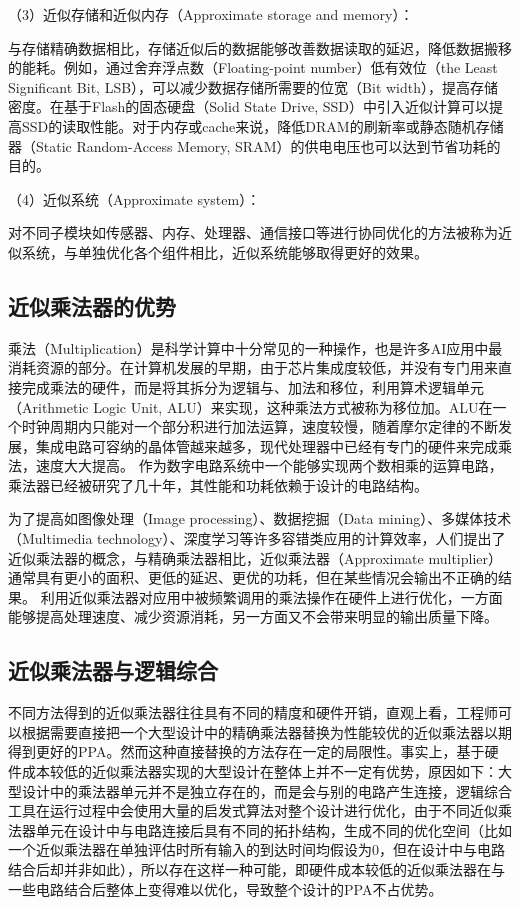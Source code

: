 （3）近似存储和近似内存（Approximate storage and memory）：

与存储精确数据相比，存储近似后的数据能够改善数据读取的延迟，降低数据搬移的能耗。例如，通过舍弃浮点数（Floating-point number）低有效位（the Least Significant Bit, LSB），可以减少数据存储所需要的位宽（Bit width），提高存储密度。在基于Flash的固态硬盘（Solid State Drive, SSD）中引入近似计算可以提高SSD的读取性能\cite{AC:Store:ASCache}。对于内存或cache来说，降低DRAM的刷新率\cite{AC:Store:DRAM}或静态随机存储器（Static Random-Access Memory, SRAM）\cite{AC:Store:SRAM}的供电电压也可以达到节省功耗的目的。

（4）近似系统（Approximate system）：

对不同子模块如传感器、内存、处理器、通信接口等进行协同优化的方法被称为近似系统，与单独优化各个组件相比，近似系统能够取得更好的效果\cite{AC:Sys:camera}。

\subsection{近似乘法器的优势}

乘法（Multiplication）是科学计算中十分常见的一种操作，也是许多AI应用中最消耗资源的部分\cite{AC:AM:Overfit}。在计算机发展的早期，由于芯片集成度较低，并没有专门用来直接完成乘法的硬件，而是将其拆分为逻辑与、加法和移位，利用算术逻辑单元（Arithmetic Logic Unit, ALU）来实现，这种乘法方式被称为移位加\cite{计算机体系结构基础}。ALU在一个时钟周期内只能对一个部分积进行加法运算，速度较慢，随着摩尔定律的不断发展，集成电路可容纳的晶体管越来越多，现代处理器中已经有专门的硬件来完成乘法，速度大大提高。
作为数字电路系统中一个能够实现两个数相乘的运算电路，乘法器已经被研究了几十年，其性能和功耗依赖于设计的电路结构。

为了提高如图像处理（Image processing）、数据挖掘（Data mining）、多媒体技术（Multimedia technology）、深度学习等许多容错类应用的计算效率，人们提出了近似乘法器的概念，与精确乘法器相比，近似乘法器（Approximate multiplier）通常具有更小的面积、更低的延迟、更优的功耗，但在某些情况会输出不正确的结果。
利用近似乘法器对应用中被频繁调用的乘法操作在硬件上进行优化，一方面能够提高处理速度、减少资源消耗，另一方面又不会带来明显的输出质量下降。

\subsection{近似乘法器与逻辑综合}

不同方法得到的近似乘法器往往具有不同的精度和硬件开销，直观上看，工程师可以根据需要直接把一个大型设计中的精确乘法器替换为性能较优的近似乘法器以期得到更好的PPA。然而这种直接替换的方法存在一定的局限性。事实上，基于硬件成本较低的近似乘法器实现的大型设计在整体上并不一定有优势，原因如下：大型设计中的乘法器单元并不是独立存在的，而是会与别的电路产生连接，逻辑综合工具在运行过程中会使用大量的启发式算法对整个设计进行优化，由于不同近似乘法器单元在设计中与电路连接后具有不同的拓扑结构，生成不同的优化空间（比如一个近似乘法器在单独评估时所有输入的到达时间均假设为0，但在设计中与电路结合后却并非如此），所以存在这样一种可能，即硬件成本较低的近似乘法器在与一些电路结合后整体上变得难以优化，导致整个设计的PPA不占优势。

